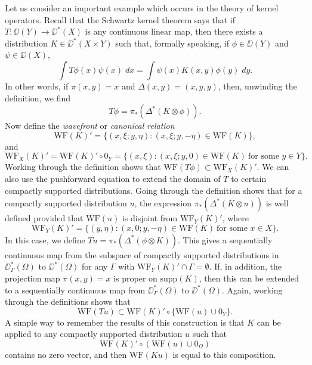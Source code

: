 Let us consider an important example which occurs in the theory of kernel operators. Recall that the Schwartz kernel theorem says that if $T: \DD(Y) \to \DD^*(X)$ is any continuous linear map, then there exists a distribution $K \in \DD^*(X \times Y)$ such that, formally speaking, if $\phi \in \DD(Y)$ and $\psi \in \DD(X)$,
%
\[ \int T\phi(x) \psi(x)\; dx = \int \psi(x) K(x,y) \phi(y)\; dy. \]
%
In other words, if $\pi(x,y) = x$ and $\Delta(x,y) = (x,y,y)$, then, unwinding the definition, we find
%
\[ T\phi = \pi_*(\Delta^* (K \otimes \phi)). \]
%
Now define the \emph{wavefront} or \emph{canonical relation}
%
\[ \text{WF}(K)' = \{ (x,\xi;y,\eta) : (x,\xi;y,-\eta) \in \text{WF}(K) \}, \]
%
and
%
\[ \text{WF}_X(K)' = \text{WF}(K)' \circ 0_Y = \{ (x,\xi): (x,\xi;y,0) \in \text{WF}(K)\ \text{for some $y \in Y$}  \}. \]
%
Working through the definition shows that $\text{WF}(T\phi) \subset \text{WF}_X(K)'$. We can also use the pushforward equation to extend the domain of $T$ to certain compactly supported distributions. Going through the definition shows that for a compactly supported distribution $u$, the expression $\pi_*(\Delta^*(K \otimes u))$ is well defined provided that $\text{WF}(u)$ is disjoint from $\text{WF}_Y(K)'$, where
%
\[ \text{WF}_Y(K)' = \{ (y,\eta) : (x,0;y,-\eta) \in \text{WF}(K)\ \text{for some $x \in X$} \}. \]
%
In this case, we define $Tu = \pi_*(\Delta^*(\phi \otimes K))$. This gives a sequentially continuous map from the subspace of compactly supported distributions in $\DD^*_\Gamma(\Omega)$ to $\DD^*(\Omega)$ for any $\Gamma$ with $\text{WF}_Y(K)' \cap \Gamma = \emptyset$. If, in addition, the projection map $\pi(x,y) = x$ is proper on $\text{supp}(K)$, then this can be extended to a sequentially continuous map from $\DD^*_\Gamma(\Omega)$ to $\DD^*(\Omega)$. Again, working through the definitions shows that
%
\[ \text{WF}(Tu) \subset \text{WF}(K)' \circ \{ \text{WF}(u) \cup 0_Y \}. \]
%
A simple way to remember the results of this construction is that $K$ can be applied to any compactly supported distribution $u$ such that
%
\[ \text{WF}(K)' \circ (\text{WF}(u) \cup 0_\Omega) \]
%
contains no zero vector, and then $\text{WF}(Ku)$ is equal to this composition.

